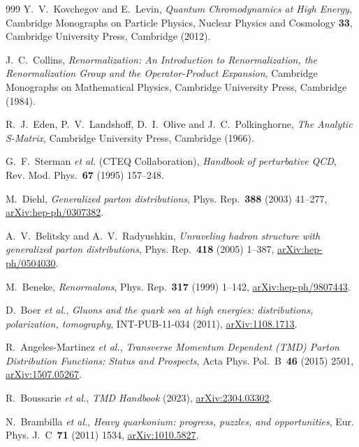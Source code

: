 \begin{thebibliography}{999}
Y.~V.~Kovchegov and E.~Levin, \emph{Quantum Chromodynamics at High Energy}, Cambridge Monographs on Particle Physics, Nuclear Physics and Cosmology \textbf{33}, Cambridge University Press, Cambridge (2012).

J.~C.~Collins, \emph{Renormalization: An Introduction to Renormalization, the Renormalization Group and the Operator-Product Expansion}, Cambridge Monographs on Mathematical Physics, Cambridge University Press, Cambridge (1984).

R.~J.~Eden, P.~V.~Landshoff, D.~I.~Olive and J.~C.~Polkinghorne, \emph{The Analytic S-Matrix}, Cambridge University Press, Cambridge (1966).

G.~F.~Sterman \emph{et al.} (CTEQ Collaboration), \emph{Handbook of perturbative QCD}, Rev. Mod. Phys.~\textbf{67} (1995) \mbox{157--248}.

M.~Diehl, \emph{Generalized parton distributions}, Phys. Rep.~\textbf{388} (2003) \mbox{41--277}, \href{https://arxiv.org/abs/hep-ph/0307382}{arXiv:hep-ph/0307382}.

A.~V.~Belitsky and A.~V.~Radyushkin, \emph{Unraveling hadron structure with generalized parton distributions}, Phys. Rep.~\textbf{418} (2005) \mbox{1--387}, \href{https://arxiv.org/abs/hep-ph/0504030}{arXiv:hep-ph/0504030}.

M.~Beneke, \emph{Renormalons}, Phys. Rep.~\textbf{317} (1999) \mbox{1--142}, \href{https://arxiv.org/abs/hep-ph/9807443}{arXiv:hep-ph/9807443}.

D.~Boer \emph{et al.}, \emph{Gluons and the quark sea at high energies: distributions, polarization, tomography}, INT-PUB-11-034 (2011), \href{https://arxiv.org/abs/1108.1713}{arXiv:1108.1713}.

R.~Angeles-Martinez \emph{et al.}, \emph{Transverse Momentum Dependent (TMD) Parton Distribution Functions: Status and Prospects}, Acta Phys. Pol.~B~\textbf{46} (2015) \mbox{2501}, \href{https://arxiv.org/abs/1507.05267}{arXiv:1507.05267}.

R.~Boussarie \emph{et al.}, \emph{TMD Handbook} (2023), \href{https://arxiv.org/abs/2304.03302}{arXiv:2304.03302}.

N.~Brambilla \emph{et al.}, \emph{Heavy quarkonium: progress, puzzles, and opportunities}, Eur. Phys. J.~C~\textbf{71} (2011) \mbox{1534}, \href{https://arxiv.org/abs/1010.5827}{arXiv:1010.5827}.


\end{thebibliography}
